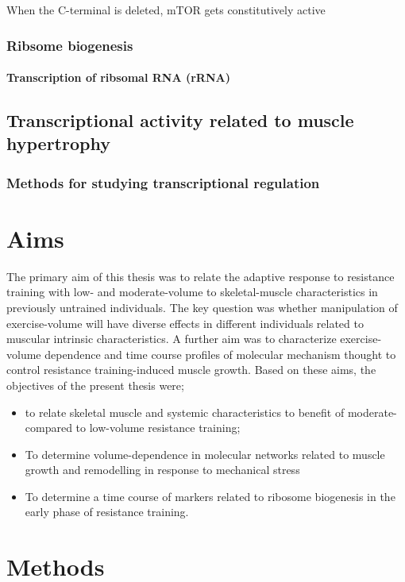 \documentclass[twoside,10pt]{gihclass} %
\providecommand{\tightlist}{%
  \setlength{\itemsep}{0pt}\setlength{\parskip}{0pt}}
\begin{document}
When the C-terminal is deleted, mTOR gets constitutively active

\hypertarget{ribsome-biogenesis}{%
\subsection{Ribsome biogenesis}\label{ribsome-biogenesis}}

\hypertarget{transcription-of-ribsomal-rna-rrna}{%
\subsubsection{Transcription of ribsomal RNA (rRNA)}\label{transcription-of-ribsomal-rna-rrna}}

\hypertarget{transcriptional-activity-related-to-muscle-hypertrophy}{%
\section{Transcriptional activity related to muscle hypertrophy}\label{transcriptional-activity-related-to-muscle-hypertrophy}}

\hypertarget{methods-for-studying-transcriptional-regulation}{%
\subsection{Methods for studying transcriptional regulation}\label{methods-for-studying-transcriptional-regulation}}

\hypertarget{aims}{%
\chapter{Aims}\label{aims}}

The primary aim of this thesis was to relate the adaptive response to resistance training with low- and moderate-volume to skeletal-muscle characteristics in previously untrained individuals. The key question was whether manipulation of exercise-volume will have diverse effects in different individuals related to muscular intrinsic characteristics. A further aim was to characterize exercise-volume dependence and time course profiles of molecular mechanism thought to control resistance training-induced muscle growth. Based on these aims, the objectives of the present thesis were;
\begin{itemize}
\tightlist
\item
  to relate skeletal muscle and systemic characteristics to benefit of moderate- compared to low-volume resistance training;
\item
  To determine volume-dependence in molecular networks related to muscle growth and remodelling in response to mechanical stress
\item
  To determine a time course of markers related to ribosome biogenesis in the early phase of resistance training.
\end{itemize}
\hypertarget{methods}{%
\chapter{Methods}\label{methods}}
\end{document}
